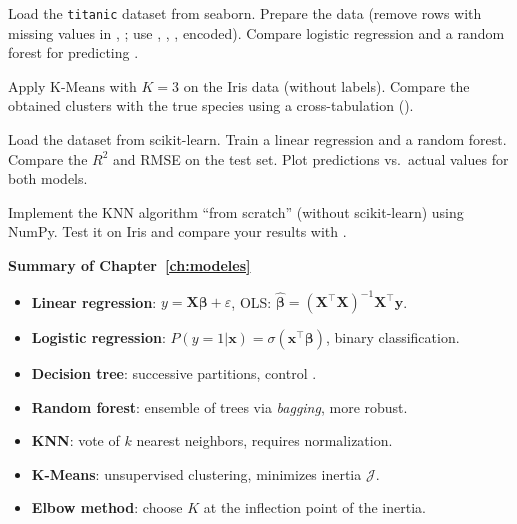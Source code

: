 \begin{exercise}[$\star\star$]
Load the \texttt{titanic} dataset from seaborn. Prepare the data (remove rows with missing values in , ; use , , ,  encoded). Compare logistic regression and a random forest for predicting .
\end{exercise}

\begin{exercise}[$\star\star$]
Apply K-Means with $K=3$ on the Iris data (without labels). Compare the obtained clusters with the true species using a cross-tabulation ().
\end{exercise}

\begin{exercise}[$\star\star\star$]
Load the  dataset from scikit-learn. Train a linear regression and a random forest. Compare the $R^2$ and RMSE on the test set. Plot predictions vs.\ actual values for both models.
\end{exercise}

\begin{exercise}[$\star\star\star$]
Implement the KNN algorithm ``from scratch'' (without scikit-learn) using NumPy. Test it on Iris and compare your results with .
\end{exercise}

\begin{keyformulas}
\textbf{Summary of Chapter~\ref{ch:modeles}}
\begin{itemize}
    \item \textbf{Linear regression}: $y = \mathbf{X}\boldsymbol{\beta} + \varepsilon$, OLS: $\hat{\boldsymbol{\beta}} = (\mathbf{X}^\top\mathbf{X})^{-1}\mathbf{X}^\top\mathbf{y}$.
    \item \textbf{Logistic regression}: $P(y{=}1|\mathbf{x}) = \sigma(\mathbf{x}^\top\boldsymbol{\beta})$, binary classification.
    \item \textbf{Decision tree}: successive partitions, control .
    \item \textbf{Random forest}: ensemble of trees via \textit{bagging}, more robust.
    \item \textbf{KNN}: vote of $k$ nearest neighbors, requires normalization.
    \item \textbf{K-Means}: unsupervised clustering, minimizes inertia $\mathcal{J}$.
    \item \textbf{Elbow method}: choose $K$ at the inflection point of the inertia.
\end{itemize}
\end{keyformulas}
